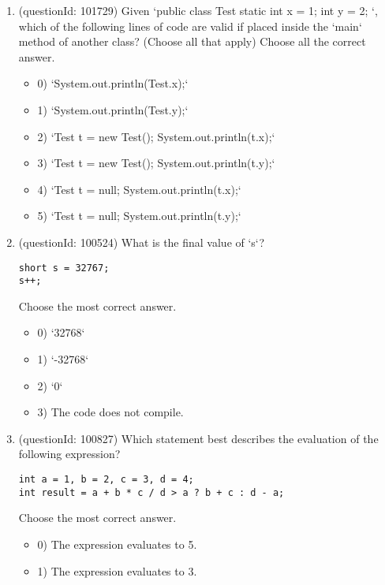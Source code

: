 \documentclass[12pt]{article}
\begin{document}
\begin{enumerate}[label=(\arabic*)]
\begin{itemize}
\end{itemize}
\item (questionId: 101729) Given `public class Test { static int x = 1; int y = 2; }`, which of the following lines of code are valid if placed inside the `main` method of another class? (Choose all that apply)
Choose all the correct answer.\begin{itemize}
\item 0) `System.out.println(Test.x);`

\item 1) `System.out.println(Test.y);`

\item 2) `Test t = new Test(); System.out.println(t.x);`

\item 3) `Test t = new Test(); System.out.println(t.y);`

\item 4) `Test t = null; System.out.println(t.x);`

\item 5) `Test t = null; System.out.println(t.y);`

\end{itemize}
\item (questionId: 100524) What is the final value of `s`?
\begin{verbatim}
short s = 32767;
s++;
\end{verbatim}
Choose the most correct answer. 
\begin{itemize}
\item 0) `32768`

\item 1) `-32768`

\item 2) `0`

\item 3) The code does not compile.

\end{itemize}
\item (questionId: 100827) Which statement best describes the evaluation of the following expression?\n\begin{verbatim}
int a = 1, b = 2, c = 3, d = 4;
int result = a + b * c / d > a ? b + c : d - a;
\end{verbatim}
Choose the most correct answer. 
\begin{itemize}
\item 0) The expression evaluates to 5.

\item 1) The expression evaluates to 3.


\end{itemize}
\end{enumerate}
\end{document}
